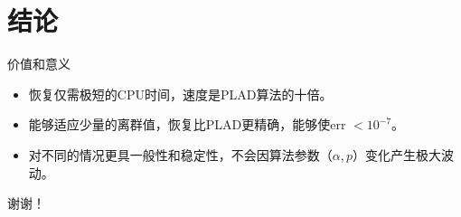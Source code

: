 \documentclass{ldr-simple-gray}
\begin{document}
\section{结论}

\begin{frame}{价值和意义}
    \begin{itemize}
        \item 恢复仅需极短的CPU时间，速度是PLAD算法的十倍。
        \item 能够适应少量的离群值，恢复比PLAD更精确，能够使err $< 10^{-7}$。
        \item 对不同的情况更具一般性和稳定性，不会因算法参数（$\alpha, p$）变化产生极大波动。
    \end{itemize}
\end{frame}
    
    






% 


\begin{frame}{\quad}
\begin{center}
        谢\quad 谢！
\end{center}

\end{frame}
\end{document}
